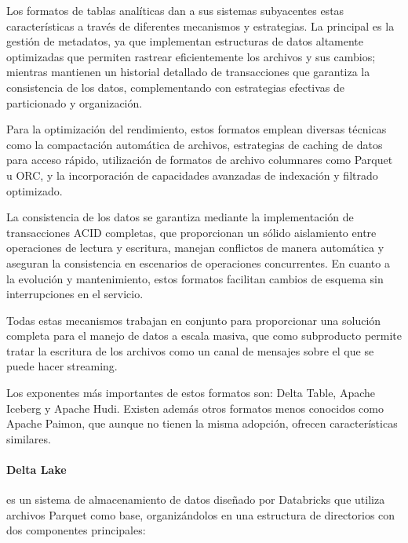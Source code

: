 Los formatos de tablas analíticas dan a sus sistemas subyacentes estas características a través de diferentes mecanismos y estrategias. 
La principal es la gestión de metadatos, ya que implementan estructuras de datos altamente optimizadas que permiten rastrear 
eficientemente los archivos y sus cambios; mientras mantienen un historial detallado de transacciones que garantiza la consistencia de los datos, 
complementando con estrategias efectivas de particionado y organización. \newline

Para la optimización del rendimiento, estos formatos emplean diversas técnicas como la compactación automática de archivos, 
estrategias de caching de datos para acceso rápido, utilización de formatos de archivo columnares como Parquet u ORC, 
y la incorporación de capacidades avanzadas de indexación y filtrado optimizado. \newline

\newpage

La consistencia de los datos se garantiza mediante la implementación de transacciones ACID completas, 
que proporcionan un sólido aislamiento entre operaciones de lectura y escritura, manejan conflictos de manera automática 
y aseguran la consistencia en escenarios de operaciones concurrentes. 
En cuanto a la evolución y mantenimiento, estos formatos facilitan cambios de esquema sin interrupciones en el servicio. \newline

Todas estas mecanismos trabajan en conjunto para proporcionar una solución completa para el manejo de datos a escala masiva,
que como subproducto permite tratar la escritura de los archivos como un canal de mensajes sobre el que se puede hacer streaming. \newline

Los exponentes más importantes de estos formatos son: Delta Table, Apache Iceberg y Apache Hudi.
Existen además otros formatos menos conocidos como Apache Paimon,
que aunque no tienen la misma adopción, ofrecen características similares. \newline

\paragraph{Delta Lake}es un sistema de almacenamiento de datos diseñado por Databricks que utiliza archivos Parquet como base, 
organizándolos en una estructura de directorios con dos componentes principales:

